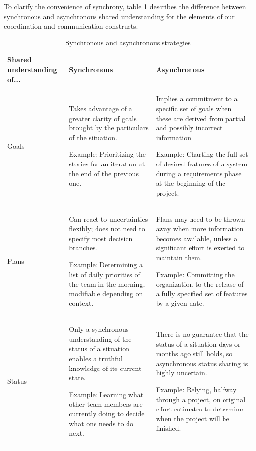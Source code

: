 To clarify the convenience of synchrony, table \ref{tab:Synchrony} describes the difference between synchronous and asynchronous shared understanding for the elements of our coordination and communication constructs. 

\begin{table}[tbp]
\caption{\label{tab:Synchrony} Synchronous and asynchronous strategies}
\centering
\footnotesize{\begin{tabular}{p{2.0cm}p{5.8cm}p{5.8cm}}
\hline \hline
\vspace{1pt} \bfseries Shared understanding of... & \vspace{1pt} \bfseries Synchronous & \vspace{1pt} \bfseries Asynchronous \\
\hline
\vspace{0.5pt} Goals & \vspace{0.5pt} Takes advantage of a greater clarity of goals brought by the particulars of the situation. \par Example: Prioritizing the stories for an iteration at the end of the previous one. & \vspace{0.5pt} Implies a commitment to a specific set of goals when these are derived from partial and possibly incorrect information. \par Example: Charting the full set of desired features of a system during a requirements phase at the beginning of the project.\\
\hline
\vspace{0.5pt} Plans & \vspace{0.5pt} Can react to uncertainties flexibly; does not need to specify most decision branches. \par Example: Determining a list of daily priorities of the team in the morning, modifiable depending on context. & \vspace{0.5pt} Plans may need to be thrown away when more information becomes available, unless a significant effort is exerted to maintain them. \par Example: Committing the organization to the release of a fully specified set of features by a given date.\\
\hline
\vspace{0.5pt} Status & \vspace{0.5pt} Only a synchronous understanding of the status of a situation enables a truthful knowledge of its current state. \par Example: Learning what other team members are currently doing to decide what one needs to do next. & \vspace{0.5pt} There is no guarantee that the status of a situation days or months ago still holds, so asynchronous status sharing is highly uncertain. \par Example: Relying, halfway through a project, on original effort estimates to determine when the project will be finished.\\

\end{tabular}}
\end{table}
